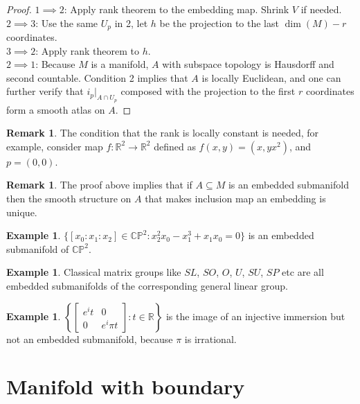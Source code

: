 \documentclass{article}
\theoremstyle{definition}
\newtheorem{rmk}[thm]{Remark}
\newtheorem{exm}[thm]{Example}
\begin{document}
\begin{proof}
$1\implies 2$: Apply rank theorem to the embedding map. Shrink $V$ if needed.\\

$2\implies 3$: Use the same $U_p$ in 2, let $h$ be the projection to the last $\dim(M)-r$ coordinates.\\

$3\implies 2$: Apply rank theorem to $h$.\\

$2\implies 1$: Because $M$ is a manifold, $A$ with subspace topology is Hausdorff and second countable. Condition 2 implies that $A$ is locally Euclidean, and one can further verify that $i_p|_{A\cap U_p}$ composed with the projection to the first $r$ coordinates form a smooth atlas on $A$.
\end{proof}

\begin{rmk}
    The condition that the rank is locally constant is needed, for example, consider map $f: \mathbb{R}^2\rightarrow \mathbb{R}^2$ defined as $f(x, y)=(x, yx^2)$, and $p=(0, 0)$.
\end{rmk}

\begin{rmk}
    The proof above implies that if $A\subseteq M$ is an embedded submanifold then the smooth structure on $A$ that makes inclusion map an embedding is unique.
\end{rmk}

\begin{exm}
    $\{[x_0:x_1:x_2]\in\mathbb{CP}^2: x_2^2x_0-x_1^3+x_1x_0=0\}$ is an embedded submanifold of $\mathbb{CP}^2$.
\end{exm}

\begin{exm}
    Classical matrix groups like $SL$, $SO$, $O$, $U$, $SU$, $SP$ etc are all embedded submanifolds of the corresponding general linear group.
\end{exm}

\begin{exm}
    $\left\{\left[\begin{array}{cc}e^it & 0\\ 0 & e^i\pi t\end{array}\right]: t\in\mathbb{R}\right\}$ is the image of an injective immersion but not an embedded submanifold, because $\pi$ is irrational.
\end{exm}


\newpage

\section{Manifold with boundary}
\end{document}
